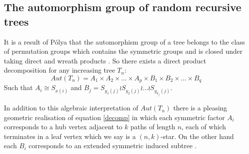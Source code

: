 \documentclass[12pt]{article} %
\theoremstyle{definition}
\begin{document}
\subsection{The automorphism group of random recursive trees}

It is a result of P\'{o}lya that the automorphism group of a tree belongs to the class of permutation groups which contains the symmetric groups and is closed under taking direct and wreath products \cite{biggs:1993}. So there exists a direct product decomposition for any increasing tree $T_{n}$:
 \begin{equation}\label{decomp}
  Aut(T_{n}) = A_{1} \times A_{2} \times\dots\times A_{p} \times B_{1} \times B_{2} \times \dots \times B_{q}
 \end{equation}
Such that $A_{i} \cong S_{x(i)}$ and $B_{j} = S_{y_{1}(j)} \wr S_{y_{2}(j)} \wr \dots \wr S_{y_{k_{j}}(j)}$.

In addition to this algebraic interpretation of $Aut(T_{n})$ there is a pleasing geometric realisation of equation \ref{decomp} in which each symmetric factor $A_{i}$ corresponds to a hub vertex adjacent to $k$ paths of length $n$, each of which terminates in a leaf vertex which we say is a $(n,k)$-star.  On the other hand each $B_{i}$ corresponds to an extended symmetric induced subtree \cite{Ben}. 
\end{document}
